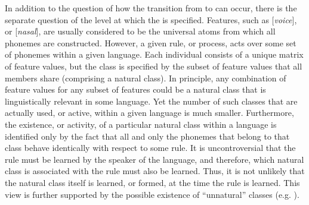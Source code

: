 In addition to the question of how the transition from to can occur, there is the separate question of the
level at which the  is specified. Features, such as {[}\emph{voice}{]},
or {[}\emph{nasal}{]}, are usually considered to be the universal
atoms from which all phonemes are constructed. However, a given rule,
or process, acts over some set of phonemes within a given language.
Each individual  consists of a unique matrix of feature values,
but the  class is specified by the subset of feature values
that all members share (comprising a natural class). In principle,
any combination of feature values for any subset of features could
be a natural class that is linguistically relevant in some language.
Yet the number of such classes that are actually used, or active,
within a given language is much smaller. Furthermore, the existence,
or activity, of a particular natural class within a language is identified
only by the fact that all and only the phonemes that belong to that
class behave identically with respect to some rule. It is uncontroversial
that the rule must be learned by the speaker of the language, and
therefore, which natural class is associated with the rule must also
be learned. Thus, it is not unlikely that the natural class itself
is learned, or formed, at the time the rule is learned. This view
is further supported by the possible existence of “unnatural”
classes (e.g. \citealt{Mielke2008}).\largerpage[-2]

